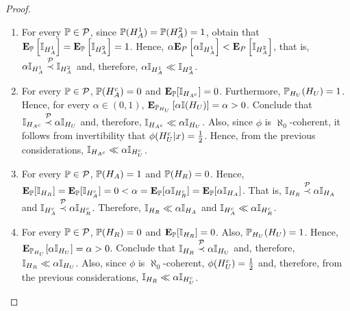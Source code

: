 \begin{proof}
 \begin{enumerate}
  \item For every $\P \in \sP$, since $\P(H_A^1) = \P(H_A^2) = 1$,
 obtain that $\E_{\P}\left[\I_{H_A^1}\right] = \E_{\P}\left[\I_{H_A^2}\right] = 1$. Hence, $\alpha\E_{P}\left[\alpha \I_{H_A^1}\right] < \E_{P}\left[\I_{H_A^2}\right]$, that is, $\alpha\I_{H_A^1} \stackrel{\sP}{\prec} \I_{H_A^2}$ and, therefore, $\alpha\I_{H_A^1} \ll \I_{H_A^2}$.
 
  \item For every $\P \in \sP$, $\P(H_A^c) = 0$ and $\E_{\P}[\I_{H_{A^c}}] = 0$. Furthermore, $\P_{H_U}(H_U) = 1$. Hence, for every $\alpha \in (0,1)$, $\E_{\P_{H_U}}\left[\alpha\I(H_U)\right] = \alpha > 0$. Conclude that $\I_{H_{A^c}} \stackrel{\sP}{\prec} \alpha \I_{H_U}$ and, therefore, $\I_{H_{A^c}} 
 \ll \alpha \I_{H_U}$. Also, since $\phi$ is $\aleph_0$-coherent,
 it follows from invertibility that $\phi(H_U^c|x) = \half$. Hence, from the previous considerations, $\I_{H_{A^c}} \ll \alpha \I_{H_U^c}$.

 \item For every $\P \in \sP$, $\P(H_A) = 1$ and $\P(H_R) = 0$. Hence, $\E_\P[\I_{H_R}] = \E_\P[\I_{H_A^c}] = 0 < \alpha = \E_\P[\alpha\I_{H_R^c}] = \E_\P[\alpha\I_{H_A}]$. That is, $\I_{H_R} \stackrel{\sP}{\prec} \alpha \I_{H_A}$ and $\I_{H_A^c} \stackrel{\sP}{\prec} \alpha \I_{H_R^c}$. Therefore,
 $\I_{H_R} \ll \alpha \I_{H_A}$ and $\I_{H_A^c} \ll \alpha \I_{H_R^c}$.
 
 \item For every $\P \in \sP$, $\P(H_R) = 0$ and $\E_\P[\I_{H_R}] = 0$. Also, $\P_{H_U}(H_U) = 1$. Hence, $\E_{\P_{H_U}}[\alpha \I_{H_U}] = \alpha > 0$. Conclude that $\I_{H_R} \stackrel{\sP}{\prec} \alpha \I_{H_U}$ and, therefore, $\I_{H_R} \ll \alpha \I_{H_U}$. Also, since $\phi$ is $\aleph_0$-coherent, $\phi(H_U^c) = \half$ and, therefore, from the previous considerations,
 $\I_{H_R} \ll \alpha \I_{H_U^c}$.
 \end{enumerate}
\end{proof}

